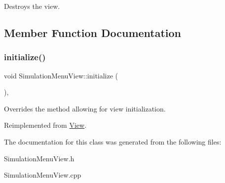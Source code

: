 Destroys the view. 



\subsection{Member Function Documentation}
\mbox{\label{class_simulation_menu_view_a6fe8f1da6cfa590491c735f6b41b6d87}} 
\subsubsection{\texorpdfstring{initialize()}{initialize()}}
{\footnotesize\ttfamily void Simulation\+Menu\+View\+::initialize (\begin{DoxyParamCaption}{ }\end{DoxyParamCaption})\hspace{0.3cm}{\ttfamily [override]}, {\ttfamily [virtual]}}



Overrides the method allowing for view initialization. 



Reimplemented from \mbox{\hyperlink{class_view_a334fa9a19d2faca0120ef2869c3dd8ad}{View}}.



The documentation for this class was generated from the following files\+:\begin{DoxyCompactItemize}
\item 
Simulation\+Menu\+View.\+h\item 
Simulation\+Menu\+View.\+cpp\end{DoxyCompactItemize}
